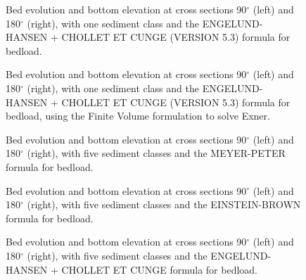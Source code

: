 \begin{figure} [!h]
\centering
{}
\caption{Bed evolution and bottom elevation at cross sections 90$^{\circ}$ (left) and 180$^{\circ}$ (right), with one sediment class and the ENGELUND-HANSEN + CHOLLET ET CUNGE (VERSION 5.3) formula for bedload.}\label{fig:results}
\end{figure}
\begin{figure} [!h]
\centering
{}
\caption{Bed evolution and bottom elevation at cross sections 90$^{\circ}$ (left) and 180$^{\circ}$ (right), with one sediment class and the ENGELUND-HANSEN + CHOLLET ET CUNGE (VERSION 5.3)
  formula for bedload, using the Finite Volume formulation to solve Exner.}\label{fig:results_vf}
\end{figure}
\begin{figure} [!h]
\centering
{}
\caption{Bed evolution and bottom elevation at cross sections 90$^{\circ}$ (left) and 180$^{\circ}$ (right), with five sediment classes and the MEYER-PETER formula for bedload.}\label{fig:results_multi1}
\end{figure}
\begin{figure} [!h]
\centering
{}
\caption{Bed evolution and bottom elevation at cross sections 90$^{\circ}$ (left) and 180$^{\circ}$ (right), with five sediment classes and the EINSTEIN-BROWN formula for bedload.}\label{fig:results_multi2}
\end{figure}
\begin{figure} [!h]
\centering
{}
\caption{Bed evolution and bottom elevation at cross sections 90$^{\circ}$ (left) and 180$^{\circ}$ (right), with five sediment classes and the ENGELUND-HANSEN + CHOLLET ET CUNGE formula for bedload.}\label{fig:results_multi3}
\end{figure}
